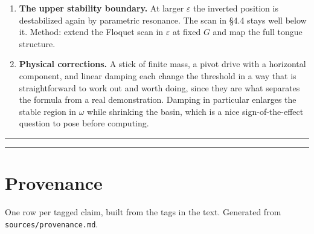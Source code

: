 \documentclass[11pt,a4paper]{article}
\begin{document}
\begin{enumerate}
  \(\varepsilon\) with an adiabatic-invariant diagnostic, or Nekhoroshev-type
  estimates.
\item
  \textbf{The upper stability boundary.} At larger \(\varepsilon\) the inverted
  position is destabilized again by parametric resonance. The scan in §4.4 stays
  well below it. Method: extend the Floquet scan in \(\varepsilon\) at fixed \(G\)
  and map the full tongue structure.
\item
  \textbf{Physical corrections.} A stick of finite mass, a pivot drive with a
  horizontal component, and linear damping each change the threshold in a way
  that is straightforward to work out and worth doing, since they are what
  separates the formula from a real demonstration. Damping in particular
  enlarges the stable region in \(\omega\) while shrinking the basin, which is a
  nice sign-of-the-effect question to pose before computing.
\end{enumerate}

\begin{center}\rule{0.5\linewidth}{0.5pt}\end{center}

\begin{center}\rule{0.5\linewidth}{0.5pt}\end{center}


\appendix

\section{Provenance}\label{app:provenance}
One row per tagged claim, built from the tags in the text. Generated from \texttt{sources/provenance.md}.
\end{document}
